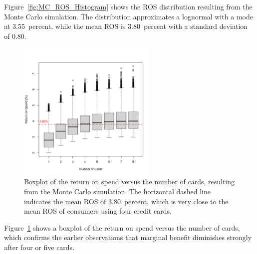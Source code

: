 Figure~\ref{fig:MC_ROS_Histogram} shows the ROS distribution resulting from the Monte Carlo simulation.
The distribution approximates a lognormal with a mode at 3.55~percent, while the mean ROS is 3.80~percent with a standard deviation of 0.80.

\begin{figure}[t!bh]
    \begin{center}
    \includegraphics[width=0.6\textwidth]{../Figures/MC_ROS_vs_K.pdf}
    \caption{Boxplot of the return on spend versus the number of cards, resulting from the Monte Carlo simulation. The horizontal dashed line indicates the mean ROS of 3.80~percent, which is very close to the mean ROS of consumers using four credit cards.}
    \label{fig:MC_ROS_vs_K}
    \end{center}
\end{figure}

Figure~\ref{fig:MC_ROS_vs_K} shows a boxplot of the return on spend versus the number of cards, which confirms the earlier observations that marginal benefit diminishes strongly after four or five cards.

